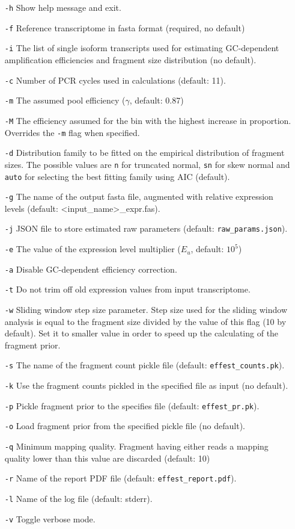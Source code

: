 \begin{itemize}
    \item[\texttt{-h}]{Show help message and exit.}
    \item[\texttt{-f}]{Reference transcriptome in fasta format (required, no default)}
    \item[\texttt{-i}]{The list of single isoform transcripts used for estimating GC-dependent amplification efficiencies and fragment size distribution (no default).}
    \item[\texttt{-c}]{Number of PCR cycles used in calculations (default: 11).}
    \item[\texttt{-m}]{The assumed pool efficiency ($\gamma$, default: 0.87)}
    \item[\texttt{-M}]{The efficiency assumed for the bin with the highest increase in proportion. Overrides the \texttt{-m} flag when specified.}
    \item[\texttt{-d}]{Distribution family to be fitted on the empirical distribution of fragment sizes. The possible values are \texttt{n} for truncated normal, \texttt{sn} for skew normal and \texttt{auto} for selecting the best fitting family using AIC (default).}
    \item[\texttt{-g}]{The name of the output fasta file, augmented with relative expression levels (default: <input\_name>\_expr.fas).}
    \item[\texttt{-j}]{JSON file to store estimated raw parameters (default: \texttt{raw\_params.json}).}
    \item[\texttt{-e}]{The value of the expression level multiplier ($E_u$, default: $10^5$)}
    \item[\texttt{-a}]{Disable GC-dependent efficiency correction.}
    \item[\texttt{-t}]{Do not trim off old expression values from input transcriptome.}
    \item[\texttt{-w}]{Sliding window step size parameter. Step size used for the sliding window analysis is equal to the fragment size divided by the value of this flag (10 by default). Set it to smaller value in order to speed up the calculating of the fragment prior.}
    \item[\texttt{-s}]{The name of the fragment count pickle file (default: \texttt{effest\_counts.pk}).}
    \item[\texttt{-k}]{Use the fragment counts pickled in the specified file as input (no default).}
    \item[\texttt{-p}]{Pickle fragment prior to the specifies file (default: \texttt{effest\_pr.pk}).}
    \item[\texttt{-o}]{Load fragment prior from the specified pickle file (no default).}
    \item[\texttt{-q}]{Minimum mapping quality. Fragment having either reads a mapping quality lower than this value are discarded (default: 10)}
    \item[\texttt{-r}]{Name of the report PDF file (default: \texttt{effest\_report.pdf}).}
    \item[\texttt{-l}]{Name of the log file (default: stderr).}
    \item[\texttt{-v}]{Toggle verbose mode.}
\end{itemize}

